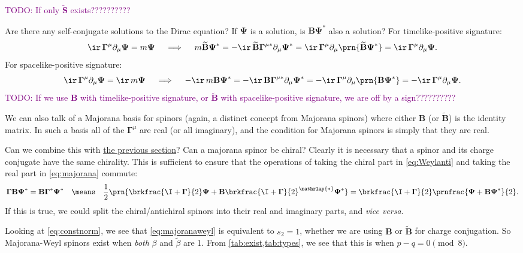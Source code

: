 \documentclass[11pt]{article}
\newcommand{\todo}[1]{\textcolor{purple}{TODO: #1}}
\newcommand{\Gammab}{\boldsymbol{\Gamma}}
\newcommand{\muc}{{\mu\ast}}
\renewcommand{\S}{\mathbf{S}}
\newcommand{\B}{\mathbf{B}}
\newcommand{\Bt}{\widetilde{\B}}
\newcommand{\St}{\widetilde{\S}}
\newcommand{\Psib}{\boldsymbol{\Psi}}
\newcommand{\betat}{\tilde{\beta}}
\begin{document}
\todo{If only \(\St\) exists??????????}

Are there any self-conjugate solutions to the Dirac equation?
If \(\Psib\) is a solution, is \(\B \Psib^\ast\) also a solution?
For timelike-positive signature:
%
\begin{equation*}
  \ir\, \Gammab^\mu \partial_\mu \Psib = m \Psib
  \quad\implies\quad
  m \Bt \Psib^\ast 
    = - \ir\, \Bt \Gammab^\muc \partial_\mu \Psib^\ast 
    = \ir\, \Gammab^\mu \partial_\mu \prn{\Bt \Psib^\ast} 
    = \ir\, \Gammab^\mu \partial_\mu \Psib. 
\end{equation*}
%
For spacelike-positive signature:
%
\begin{equation*}
  \ir\, \Gammab^\mu \partial_\mu \Psib = \ir\, m \Psib
  \quad\implies\quad
  - \ir\, m \B \Psib^\ast 
    = - \ir\, \B \Gammab^\muc \partial_\mu \Psib^\ast 
    = - \ir\, \Gammab^\mu \partial_\mu \prn{\B \Psib^\ast} 
    = - \ir\, \Gammab^\mu \partial_\mu \Psib. 
\end{equation*}
%
\todo{If we use \(\B\) with timelike-positive signature, or \(\Bt\) with spacelike-positive signature, we are off by a sign??????????}

We can also talk of a Majorana basis for spinors (again, a distinct concept from Majorana spinors) where either $\B$ (or $\Bt$) is the identity matrix.
In such a basis all of the $\Gammab^\mu$ are real (or all imaginary), and the condition for Majorana spinors is simply that they are real.

Can we combine this with \hyperref[sec:weyl]{the previous section}?
Can a majorana spinor be chiral?
Clearly it is necessary that a spinor and its charge conjugate  have the same chirality.
This is sufficient to ensure that the operations of taking the chiral part in \cref{eq:Weylanti} and taking the real part in \cref{eq:majorana} commute:
%
\begin{equation}\label{eq:majoranaweyl}
  \Gammab \B \Psib^\ast = \B \Gammab^\ast \Psib^\ast
  \quad\means\quad
  \frac{1}{2}\prn{\brkfrac{\I+\Gammab}{2} \Psib 
    + \B \brkfrac{\I+\Gammab}{2}^{\mathrlap{\ast}} \Psib^\ast} 
    = \brkfrac{\I+\Gammab}{2} \prnfrac{\Psib + \B \Psib^\ast}{2}.
\end{equation}
%
If this is true, we could split the chiral/antichiral spinors into their real and imaginary parts, and \emph{vice versa}.

Looking at \cref{eq:constnorm}, we see that \cref{eq:majoranaweyl} is equivalent to \(s_2 = 1\), whether we are using \(\B\) or \(\Bt\) for charge conjugation.
So Majorana-Weyl spinors exist when \emph{both} \(\beta\) and \(\betat\) are 1.
From \cref{tab:exist,tab:types}, we see that this is when \( p-q = 0 \pmod 8 \).
\end{document}
